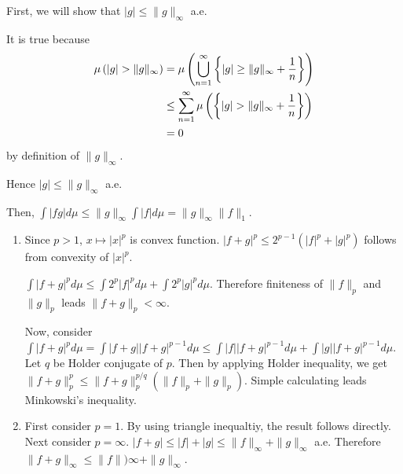 \begin{problem}[1.5.1] \hfill

	First, we will show that $ | g | \leq \| g \|_\infty$ a.e.

	It is true because
	\begin{equation*}
		\begin{split}
			\mu\left( |g| > \|g\|_\infty \right) & =
			\mu\left( \bigcup_{n=1}^{\infty}\left\{ |g| \geq \| g \|_\infty + {1 \over n} \right\} \right) \\
			& \leq \sum_{n=1}^{\infty}\mu\left( \left\{ |g| > \|g\|_\infty + {1 \over n} \right\} \right) \\
			& = 0
		\end{split}
		\label{<+label+>}
	\end{equation*}
	by definition of $\|g \|_\infty$.

	Hence $|g| \leq \| g \|_\infty$ a.e.

	Then, $\int |fg|d\mu \leq \|g \|_\infty \int |f| d\mu = \|g \|_\infty \| f \|_1$. 
\end{problem}

\begin{problem}[1.5.3] \hfill
	\begin{enumerate}[label = (\alph*)]
		\item Since $p>1$, $x \mapsto |x|^p$ is convex function. $|f+g|^p \leq 2^{p-1}(|f|^p + |g|^p)$ follows from convexity of $|x|^p$.

			$\int |f+g|^p d\mu \leq \int 2^p|f|^p d\mu + \int 2^p |g|^p d\mu$. Therefore finiteness of $\|f \|_p$ and $\| g \|_p$ leads $\| f + g \|_p < \infty$.

			Now, consider $\int |f+g|^p d\mu = \int |f+g||f+g|^{p-1}d\mu \leq \int |f||f+g|^{p-1}d\mu + \int |g||f+g|^{p-1}d\mu$. Let $q$ be Holder conjugate of $p$. Then by applying Holder inequality, we get $\|f+g\|_p^p \leq \|f+g\|_p^{p/q}(\|f\|_p + \|g\|_p)$. Simple calculating leads Minkowski's inequality.

		\item First consider $p=1$. By using triangle inequaltiy, the result follows directly.
		Next consider $p=\infty$. $|f+g| \leq |f| + |g| \leq \| f \|_\infty + \| g \|_\infty$ a.e. Therefore $\| f + g \|_\infty \leq \|f \|)\infty + \| g \|_\infty$.
	\end{enumerate}
\end{problem}

